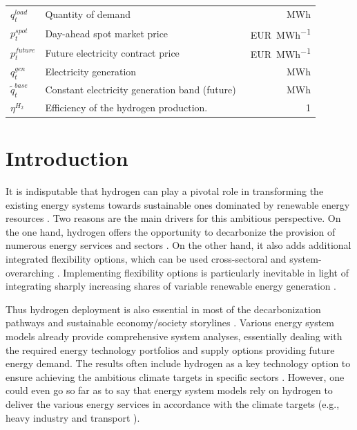 \documentclass[review]{elsarticle}
\begin{document}
\begin{center}
\begin{tabular}{lm{8cm}r}
		{$q_{t}^{load}$} & Quantity of demand & \SI{}{MWh}\\
		{$p_{t}^{spot}$} & Day-ahead spot market price & \SI{}{EUR\per MWh}\\
		{$p_{t}^{future}$} & Future electricity contract price & \SI{}{EUR\per MWh}\\
		{$q_{t}^{gen}$} & Electricity generation & \SI{}{MWh}\\
		{$\tilde{q}_{t}^{base}$} & Constant electricity generation band (future)& \SI{}{MWh}\\
		{$\eta^{H_2}$} & Efficiency of the hydrogen	production.& \SI{}{1}\\	
		\hline
	\end{tabular}
\end{center}
\newpage
\section{Introduction}
It is indisputable that hydrogen can play a pivotal role in transforming the existing energy systems towards sustainable ones dominated by renewable energy resources \cite{dunn2002hydrogen}. Two reasons are the main drivers for this ambitious perspective. On the one hand, hydrogen offers the opportunity to decarbonize the provision of numerous energy services and sectors \cite{midilli2008hydrogen}. On the other hand, it also adds additional integrated flexibility options, which can be used cross-sectoral and system-overarching \cite{kueppers2021decarbonization}. Implementing flexibility options is particularly inevitable in light of integrating sharply increasing shares of variable renewable energy generation \cite{kroniger2014hydrogen}.\vspace{0.3cm}

Thus hydrogen deployment is also essential in most of the decarbonization pathways and sustainable economy/society storylines \cite{herbst2021scenario}. Various energy system models already provide comprehensive system analyses, essentially dealing with the required energy technology portfolios and supply options providing future energy demand. The results often include hydrogen as a key technology option to ensure achieving the ambitious climate targets in specific sectors \cite{lux2020supply}. However, one could even go so far as to say that energy system models rely on hydrogen to deliver the various energy services in accordance with the climate targets (e.g., heavy industry \cite{rissman2020technologies} and transport \cite{zhang2016times}).\vspace{0.3cm}
\end{document}
